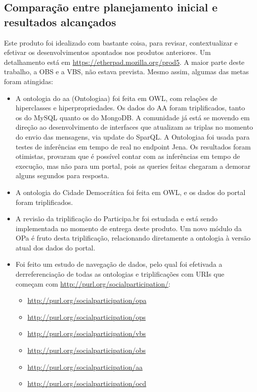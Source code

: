 \documentclass[12pt]{article}
\begin{document}
\subsection{Comparação entre planejamento inicial e resultados alcançados}
Este produto foi idealizado com bastante coisa, para revisar, contextualizar e efetivar os desenvolvimentos apontados nos produtos anteriores. Um detalhamento está em \url{https://etherpad.mozilla.org/prod5}. A maior parte deste trabalho, a OBS e a VBS, não estava prevista. Mesmo assim, algumas das metas foram atingidas:
\begin{itemize}
    \item A ontologia do aa (Ontologiaa) foi feita em OWL, com relações de hiperclasses e hiperpropriedades. Os dados do AA foram triplificados, tanto os do MySQL quanto os do MongoDB. A comunidade já está se movendo em direção ao desenvolvimento de interfaces que atualizam as triplas no momento do envio das mensagens, via update do SparQL. A Ontologiaa foi usada para testes de inferências em tempo de real no endpoint Jena. Os resultados foram otimistas, provaram que é possível contar com as inferências em tempo de execução, mas não para um portal, pois as queries feitas chegaram a demorar alguns segundos para resposta.
    \item A ontologia do Cidade Democrática foi feita em OWL, e os dados do portal foram triplificados.
    \item A revisão da triplificação do Participa.br foi estudada e está sendo implementada no momento de entrega deste produto. Um novo módulo da OPa é fruto desta triplificação, relacionando diretamente a ontologia à versão atual dos dados do portal.
    \item Foi feito um estudo de navegação de dados, pelo qual foi efetivada a derreferenciação de todas as ontologias e triplificações com URIs que começam com \url{http://purl.org/socialparticipation/}:
\begin{itemize}
    \item \url{http://purl.org/socialparticipation/opa}
    \item \url{http://purl.org/socialparticipation/ops}
    \item \url{http://purl.org/socialparticipation/vbs}
    \item \url{http://purl.org/socialparticipation/obs}
    \item \url{http://purl.org/socialparticipation/aa}
    \item \url{http://purl.org/socialparticipation/ocd}
\end{itemize}
\end{itemize}
\end{document}
